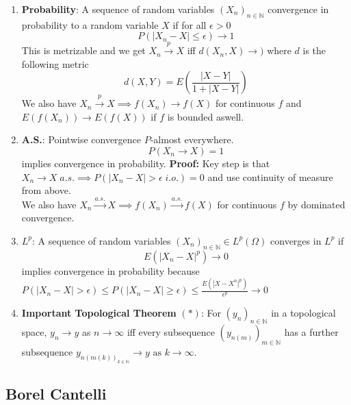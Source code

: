 \documentclass{article}
\begin{document}
\begin{enumerate}
    \item \textbf{Probability}: A sequence of random variables \((X_n)_{n \in \mathbb{N}}\) convergence in probability to a random variable \(X\) if for all \(\epsilon > 0\)
    \[
    P(|X_n - X| \leq \epsilon)  \to 1
    \]
    This is metrizable and we get \(X_n \overset{p}{\to}X \) iff \(d(X_n, X) \to )\) where \(d\) is the following metric
    \[
    d(X,Y) = E\left(\frac{|X-Y|}{1+ |X-Y|}\right)
    \]
    We also have \(X_n \overset{p}{\to} X \implies f(X_n) \to f(X)\) for continuous \(f\) and \(E(f(X_n)) \to E(f(X))\) if \(f\) is bounded aswell.

    \item \textbf{A.S.}: Pointwise convergence \(P\)-almost everywhere.
    \[
    P(X_n \to X) = 1
    \]
    implies convergence in probability. \textbf{Proof:} Key step is that \(X_n \to X \; a.s. \implies P(|X_n - X| > \epsilon \; i.o.) = 0\) and use continuity of measure from above.\\

    We also have \(X_n \overset{a.s.}{\to}X \implies f(X_n) \overset{a.s.}{\to }f(X)\) for continuous \(f\) by dominated convergence.

    \item \textbf{\(L^p\)}: A sequence of random variables \((X_n)_{n \in \mathbb{N}} \in L^p(\Omega)\) converges in \(L^p\) if
    \[
    E(|X_n-X|^p) \to 0
    \]
    implies convergence in probability because \(P(|X_n-X|> \epsilon) \leq P(|X_n - X|\geq \epsilon) \leq \frac{E(|X - X^n|^p)}{\epsilon^p} \to 0\)

    \item \textbf{Important Topological Theorem\label{thm: topological theorem}} $(*)$: For \((y_n)_{n \in \mathbb{N}}\) in a topological space, \(y_n \to y\) as \(n \to \infty\) iff every subsequence \((y_{n(m)})_{m \in \mathbb{N}}\) has a further subsequence \(y_{n(m(k))_{k \in \mathbb{N}}} \to y \text{ as } k \to \infty\).\\

\end{enumerate}

\subsection*{Borel Cantelli}
\end{document}

